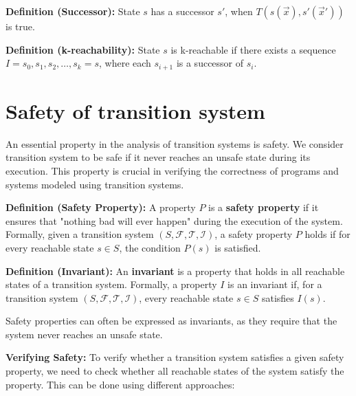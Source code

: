 \vspace{\baselineskip}\noindent\textbf{Definition (Successor):\cite{7886665}} State $s$ has a successor $s'$, when $T(s(\vec{x}), s'(\vec{x}'))$ is true.

\vspace{\baselineskip}\noindent\textbf{Definition (k-reachability):\cite{7886665}} State $s$ is k-reachable if there exists a sequence \newline\noindent $I = s_0, s_1, s_2, \ldots, s_k = s$, where each $s_{i+1}$ is a successor of $s_i$.


\section{Safety of transition system}
\noindent An essential property in the analysis of transition systems is safety. We consider transition system to be safe if it never reaches an unsafe state during its execution. This property is crucial in verifying the correctness of programs and systems modeled using transition systems.

\vspace{\baselineskip}\noindent\textbf{Definition (Safety Property):}
A property \( P \) is a \textbf{safety property} if it ensures that "nothing bad will ever happen" during the execution of the system. Formally, given a transition system \( (S, \mathcal{F}, \mathcal{T}, \mathcal{I}) \), a safety property \( P \) holds if for every reachable state \( s \in S \), the condition \( P(s) \) is satisfied.

\vspace{\baselineskip}\noindent\textbf{Definition (Invariant):\cite{7886665}}
An \textbf{invariant} is a property that holds in all reachable states of a transition system. Formally, a property \( I \) is an invariant if, for a transition system \( (S, \mathcal{F}, \mathcal{T}, \mathcal{I}) \), every reachable state \( s \in S \) satisfies \( I(s) \).

\noindent Safety properties can often be expressed as invariants, as they require that the system never reaches an unsafe state.

\vspace{\baselineskip}\noindent\textbf{Verifying Safety:} To verify whether a transition system satisfies a given safety property, we need to check whether all reachable states of the system satisfy the property. This can be done using different approaches:

